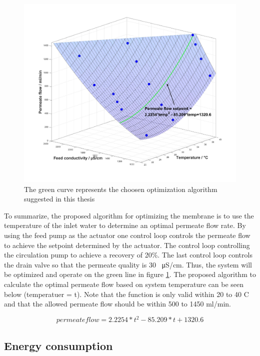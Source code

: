 \begin{figure}[H]
    \centering
    \includegraphics[width=1\textwidth]{FinalResult_4}
    \caption{The green curve represents the choosen optimization algorithm suggested in this thesis}
    \label{fig:FinalResult_4}
\end{figure}

To summarize, the proposed algorithm for optimizing the membrane is to use the temperature of the inlet water to determine an optimal permeate flow rate. By using the feed pump as the actuator one control loop controls the permeate flow to achieve the setpoint determined by the actuator. The control loop controlling the circulation pump to achieve a recovery of 20\%. The last control loop controls the drain valve so that the permeate quality is 30 \SI{}{\micro\siemens}/cm. Thus, the system will be optimized and operate on the green line in figure \ref{fig:FinalResult_4}. The proposed algorithm to calculate the optimal permeate flow based on system temperature can be seen below (temperatuer = t). Note that the function is only valid within 20 to 40 C and that the allowed permeate flow should be within 500 to 1450 ml/min. 

\begin{equation}
permeate flow =  2.2254*t^2-85.209*t+1320.6
\end{equation}

\newpage

\subsection{Energy consumption}

